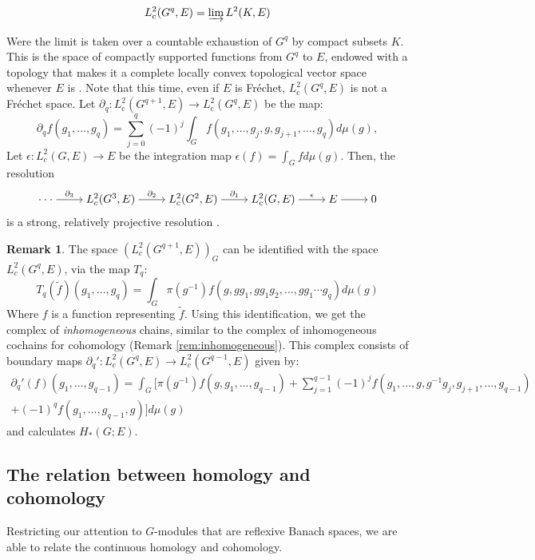 \documentclass[12pt,reqno]{amsart}
\theoremstyle{definition}
\newtheorem{remark}[theorem]{Remark}
\begin{document}
$$L^2_\mathrm{c}(G^q,E)= \varinjlim L^2(K,E)$$

Were the limit is taken over a countable exhaustion of $G^q$ by compact subsets $K$. This is the space of compactly supported functions from $G^q$ to $E$, endowed with a topology that makes it a complete locally convex topological vector space whenever $E$ is \cite[Theorem~II.6.6]{SchaeferWolff}. Note that this time, even if $E$ is Fr\'echet, $L^2_\mathrm{c}(G^q,E)$ is not a Fr\'echet space. Let $\partial_q:L^2_\mathrm{c}(G^{q+1},E) \rightarrow L^2_\mathrm{c}(G^q,E)$ be the map:
$$\partial_qf(g_1,\dots,g_{q})= \sum_{j=0}^{q}(-1)^j\int_G f(g_1,\dots,g_j,g,g_{j+1},\dots,g_{q})d\mu(g), $$
Let $\epsilon: L^2_c(G,E) \rightarrow E$ be the integration map $\epsilon(f)= \int_G fd\mu(g)$. Then, the resolution
\[
\begin{tikzcd}[cramped]
	{\cdot \cdot \cdot} & {L^2_c(G^3,E)} & {L^2_c(G^2,E)} & {L^2_c(G,E)} & E & 0
	\arrow["{\partial_3}", from=1-1, to=1-2]
	\arrow["{\partial_2}", from=1-2, to=1-3]
	\arrow["{\partial_1}", from=1-3, to=1-4]
	\arrow["\epsilon", from=1-4, to=1-5]
	\arrow[from=1-5, to=1-6]
\end{tikzcd}
\]
 is a strong, relatively projective resolution \cite[Theorem~C.21]{Petersen}.
\begin{remark}\label{rem:inhomogeneousHomology}
    The space $(L^2_c(G^{q+1},E))_G$ can be identified with the space $L^2_c(G^q,E)$, via the map $T_q$:
    $$T_q(\tilde{f})(g_1,\dots,g_q)=\int_G \pi(g^{-1})f(g,gg_1,gg_1g_2,\dots,gg_1 \cdots g_q)d\mu(g)$$
    Where $f$ is a function representing $\tilde{f}$. Using this identification, we get the complex of \emph{inhomogeneous} chains, similar to the  complex of inhomogeneous cochains for cohomology (Remark \ref{rem:inhomogeneous}). This complex consists of boundary maps $\partial_q':L^2_c(G^{q},E) \rightarrow L^2_c(G^{q-1},E)$ given by:
    \begin{align*}
    \partial_q'(f)(g_1,\dots,g_{q-1})=\int_G[\pi(g^{-1})f(g,g_1,\dots,g_{q-1})+\sum_{j=1}^{q-1}(-1)^j f(g_1,\dots,g,g^{-1}g_j,g_{j+1},\dots,g_{q-1}) \\
    +(-1)^{q}f(g_1,\dots,g_{q-1},g)]d\mu(g) 
    \end{align*}
    and calculates $H_*(G;E)$\cite[Theorem~C.31]{Petersen}. 
\end{remark}
\subsection{The relation between homology and cohomology} \label{subsec:The relation between homology and cohomology}
Restricting our attention to $G$-modules that are reflexive Banach spaces, we are able to relate the continuous homology and cohomology.
\end{document}
